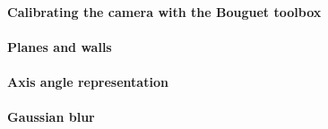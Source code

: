 %  
\paragraph{Calibrating the camera with the Bouguet toolbox}
%  
%  
%  
%  
%  
\paragraph{Planes and walls}
%  
\paragraph{Axis angle representation}
%  
\paragraph{Gaussian blur}
